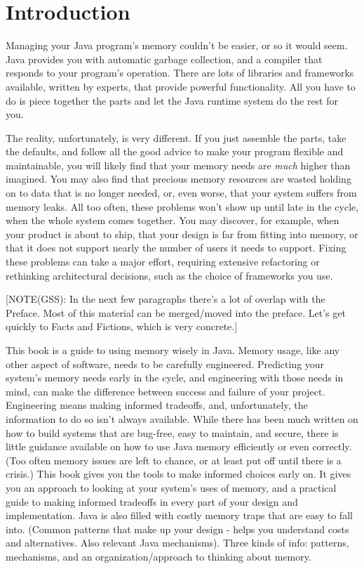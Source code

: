 
\chapter{Introduction}
\label{chapter:introduction}

Managing your Java program's memory couldn't be easier, or so it would
seem. Java provides you with automatic garbage collection, and a compiler that
responds to your program's operation. There are lots of
libraries and frameworks available, written by experts, that provide powerful
functionality. All you have to do is piece together
the parts and let the Java runtime system do the rest for you.

The reality, unfortunately, is very different. If you just assemble the parts, take
the defaults, and follow all the good advice to make your
program flexible and maintainable, you will likely find that your memory needs are
\emph{much} higher than imagined. You may also find that precious memory
resources are wasted holding on to data that is no longer needed, or, even
worse, that your system suffers from memory leaks. All too often, these problems
won't show up until late in the cycle, when the whole system comes together. 
You may discover, for example, when your product is about to ship, that your design is
far from fitting into memory, or that it does not support nearly the number
of users it needs to support. Fixing these problems can
take a major effort, requiring extensive refactoring or rethinking
architectural decisions, such as the choice of frameworks you use.

[NOTE(GSS): In the next few paragraphs there's a lot of overlap with the
Preface.
Most of this material can be merged/moved into the preface. Let's 
get quickly to Facts and Fictions, which is very concrete.]

This book is a guide to using memory wisely in Java. Memory usage,
like any other aspect of software, needs to be carefully
engineered. Predicting
your system's memory needs early in the cycle, and engineering with those needs in mind, can make
the difference between success and failure of your project. Engineering means making
informed tradeoffs, and, unfortunately, the information
to do so isn't always available. While there has been much written on how to
build systems that are bug-free, easy to maintain, and secure,
there is little guidance available on how to use Java memory efficiently
or even correctly. (Too often memory issues are left to chance, or at least
put off until there is a crisis.)  This book gives you the tools to make
informed choices early on.  It gives you 
an approach to looking at your system's uses of memory, and a practical guide
to making informed tradeoffs in every part of your design and
implementation. Java is also filled with
costly memory traps that are easy to fall into.  
 (Common patterns that make up your design - helps you understand costs and alternatives.  Also 
relevant Java mechanisms).  Three kinds of info: patterns, mechanisms, and an
organization/approach to thinking about memory.

